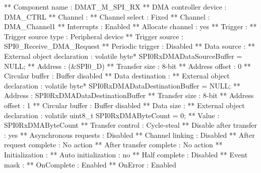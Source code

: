 \begin{DoxyCode}
**          Component name                                 : DMAT\_M\_SPI\_RX
**          DMA controller device                          : DMA\_CTRL
**          Channel                                        : 
**            Channel select                               : Fixed
**              Channel                                    : DMA\_Channel1
**              Interrupts                                 : Enabled
**              Allocate channel                           : yes
**          Trigger                                        : 
**            Trigger source type                          : Peripheral device
**              Trigger source                             : SPI0\_Receive\_DMA\_Request
**              Periodic trigger                           : Disabled
**          Data source                                    : 
**            External \textcolor{keywordtype}{object} declaration                  : \textcolor{keyword}{volatile} byte* SPI0RxDMADataSourceBuffer = 
      NULL;
**            Address                                      : (&SPI0\_D)
**            Transfer size                                : 8-bit
**            Address offset                               : 0
**            Circular buffer                              : Buffer disabled
**          Data destination                               : 
**            External \textcolor{keywordtype}{object} declaration                  : \textcolor{keyword}{volatile} byte* SPI0RxDMADataDestinationBuffer 
      = NULL;
**            Address                                      : SPI0RxDMADataDestinationBuffer
**            Transfer size                                : 8-bit
**            Address offset                               : 1
**            Circular buffer                              : Buffer disabled
**          Data size                                      : 
**            External \textcolor{keywordtype}{object} declaration                  : \textcolor{keyword}{volatile} uint8\_t SPI0RxDMAByteCount = 0;
**            Value                                        : SPI0RxDMAByteCount
**          Transfer control                               : Cycle-steal
**            Disable after transfer                       : yes
**            Asynchronous requests                        : Disabled
**            Channel linking                              : Disabled
**            After request complete                       : No action
**            After transfer complete                      : No action
**          Initialization                                 : 
**            Auto initialization                          : no
**            Half complete                                : Disabled
**            Event mask                                   : 
**              OnComplete                                 : Enabled
**              OnError                                    : Enabled
\end{DoxyCode}
